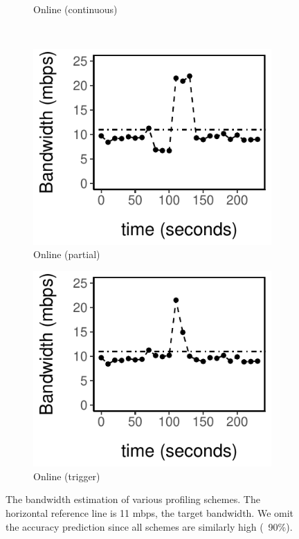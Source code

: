 \begin{figure}
\begin{subfigure}[t]{0.48\columnwidth}
    \caption{Online (continuous)}
    \label{fig:online}
  \end{subfigure}
  \\
  \vspace{1.5em}
  \begin{subfigure}[t]{0.48\columnwidth}
    \includegraphics[width=\textwidth]{figures/online3.pdf}
    \caption{Online (partial)}
    \label{fig:online-partial}
  \end{subfigure}
  \hfill
  \begin{subfigure}[t]{0.48\columnwidth}
    \includegraphics[width=\textwidth]{figures/online4.pdf}
    \caption{Online (trigger)}
    \label{fig:online-trigger}
  \end{subfigure}
  \caption{The bandwidth estimation of various profiling schemes. The horizontal
    reference line is 11 mbps, the target bandwidth. We omit the accuracy
    prediction since all schemes are similarly high (~90\%).}
  \label{fig:online-tricks}
\end{figure}

